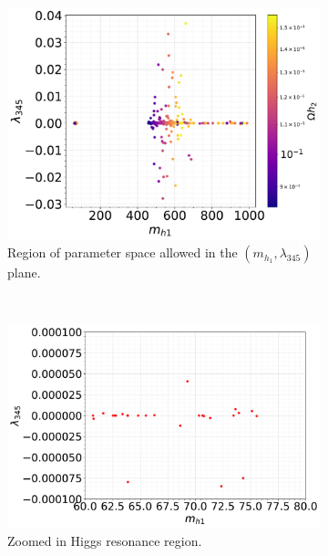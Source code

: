 \documentclass[12pt]{article}
\newcommand{\mhone}{m_{h_1}}
\begin{document}
\begin{figure}[H]
    \centering
    \begin{subfigure}[b]{0.49\textwidth}
        \centering
        \includegraphics[width=\textwidth]{single_plots/l345_against_MD1_Omegah2.pdf}
        \caption{Region of parameter space allowed in the $(\mhone,\lambda_{345})$ plane.}
        \label{fig:MD1_l345_1}
    \end{subfigure}
    \\
    \begin{subfigure}[b]{0.49\textwidth}
        \centering
        \includegraphics[width=\textwidth]{single_plots_(small_range)/l345_against_MD1_Omegah2.pdf}
        \caption{Zoomed in Higgs resonance region.}
        \label{fig:label}
    \end{subfigure}
        \hfill
    \begin{subfigure}[b]{0.49\textwidth}

\end{subfigure}
\end{figure}
\end{document}
